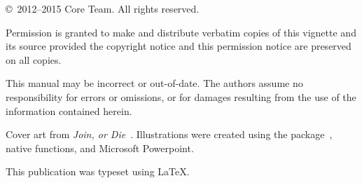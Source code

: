 \null
\vfill

\copyright\ 2012--2015 \pbdR Core Team.  All rights reserved.

Permission is granted to make and distribute verbatim copies of this vignette
and its source provided the copyright notice and this permission notice are
preserved on all copies.

This manual may be incorrect or out-of-date.  The authors assume
no responsibility for errors or omissions, or for damages resulting
from the use of the information contained herein.

Cover art from \textit{Join, or Die}~\citep{franklin1754join}. Illustrations were created 
using the  package~\citep{ggplot2}, native  functions, and Microsoft 
Powerpoint.

This publication was typeset using \LaTeX. 
